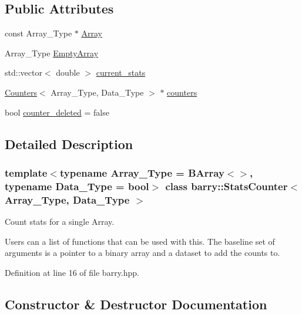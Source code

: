\subsection*{Public Attributes}
\begin{DoxyCompactItemize}
\item 
const Array\+\_\+\+Type $\ast$ \hyperlink{classbarry_1_1_stats_counter_a4a963a5edf23d0527e1ef87c52c04a97}{Array}
\item 
Array\+\_\+\+Type \hyperlink{classbarry_1_1_stats_counter_ad78463fadfa385a69121c40fdc8fd193}{Empty\+Array}
\item 
std\+::vector$<$ double $>$ \hyperlink{classbarry_1_1_stats_counter_ad99718884cffbeca3cb98d574f6956a1}{current\+\_\+stats}
\item 
\hyperlink{classbarry_1_1_counters}{Counters}$<$ Array\+\_\+\+Type, Data\+\_\+\+Type $>$ $\ast$ \hyperlink{classbarry_1_1_stats_counter_a7100901cfe8f02c96b76b381fa06f94c}{counters}
\item 
bool \hyperlink{classbarry_1_1_stats_counter_a0e9924b44520a91c7384a464fa9711b7}{counter\+\_\+deleted} = false
\end{DoxyCompactItemize}


\subsection{Detailed Description}
\subsubsection*{template$<$typename Array\+\_\+\+Type = B\+Array$<$$>$, typename Data\+\_\+\+Type = bool$>$\newline
class barry\+::\+Stats\+Counter$<$ Array\+\_\+\+Type, Data\+\_\+\+Type $>$}

Count stats for a single Array. 

Users can a list of functions that can be used with this. The baseline set of arguments is a pointer to a binary array and a dataset to add the counts to. 

Definition at line 16 of file barry.\+hpp.



\subsection{Constructor \& Destructor Documentation}
\mbox{\label{classbarry_1_1_stats_counter_a43e9fa90ef0b1fb716f0e75d1b803ef1}} 
